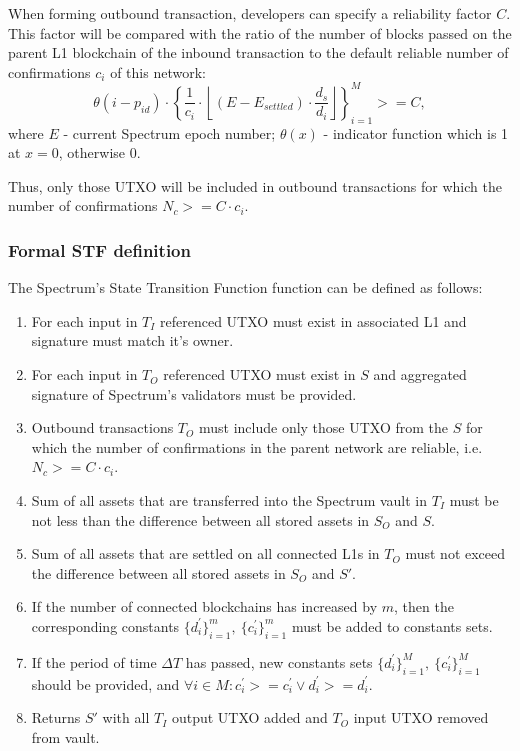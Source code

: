 When forming outbound transaction, developers can specify a reliability factor $C$.
This factor will be compared with the ratio of the number of blocks passed on the parent L1 blockchain of the inbound transaction to the default reliable number of confirmations $c_i$ of this network:
\begin{equation}
    \theta(i-p_{id})\cdot \left\{\frac{1}{c_i} \cdot \left\lfloor (E-E_{settled}) \cdot \frac{d_s}{d_i}\right\rfloor\right\}_{i=1}^{M} >= C,\label{eq:equation2}
\end{equation}
where $E$ - current Spectrum epoch number; $\theta(x)$ - indicator function which is 1 at $x = 0$, otherwise 0.


Thus, only those UTXO will be included in outbound transactions for which the number of confirmations $N_c>=C\cdot c_i$.

\subsubsection{Formal STF definition}
The Spectrum's State Transition Function function can be defined as follows:

\begin{enumerate}
    \item For each input in $T_I$ referenced UTXO must exist in associated L1 and signature must match it's owner.
    \item For each input in $T_O$ referenced UTXO must exist in $S$ and aggregated signature of Spectrum's validators must be provided.
    \item Outbound transactions $T_O$ must include only those UTXO from the $S$ for which the number of confirmations in the parent network are reliable, i.e. $N_c>=C\cdot c_i$.
    \item Sum of all assets that are transferred into the Spectrum vault in $T_I$ must be not less than the difference between all stored assets in $S_O$ and $S$.
    \item Sum of all assets that are settled on all connected L1s in $T_O$ must not exceed the difference between all stored assets in $S_O$ and $S'$.
    \item If the number of connected blockchains has increased by $m$, then the corresponding constants $\{d_{i}^{'}\}_{i=1}^{m},\ \{c_{i}^{'}\}_{i=1}^{m}$ must be added to constants sets.
    \item If the period of time $\Delta T$ has passed, new constants sets $\{d_{i}^{'}\}_{i=1}^{M},\ \{c_{i}^{'}\}_{i=1}^{M}$ should be provided, and $\forall i \in M: {c^{'}_i >= c^{'}_i \vee d^{'}_i >= d^{'}_i}$.
    \item Returns $S'$ with all $T_I$ output UTXO added and $T_O$ input UTXO removed from vault.

\end{enumerate}